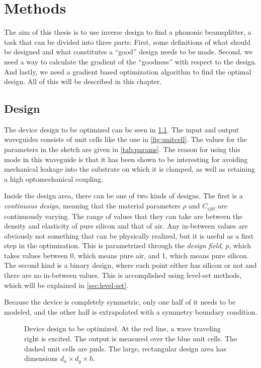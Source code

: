 \chapter{Methods}\label{sec:methods}

The aim of this thesis is to use inverse design to find a phononic beamsplitter,
a task that can be divided into three parts: 
First, some definitions of what
should be designed and what constitutes a ``good'' design needs to be made.
Second, we need a way to calculate the gradient of the ``goodness'' with respect
to the design.
And lastly, we need a gradient based optimization algorithm to find the optimal
design.
All of this will be described in this chapter.

\section{Design}

The device design to be optimized can be seen in \cref{fig:bs-design}.
The input and output waveguides consists of unit cells like the one in
\cref{fig:unitcell}.
The values for the parameters in the sketch are given in \cref{tab:params}.
The reason for using this mode in this waveguide is that it has been shown to be
interesting for avoiding mechanical leakage into the substrate on which it is
clamped, as well as retaining a high optomechanical
coupling.\cite{kolvik_clamped_2023}

Inside the design area, there can be one of two kinds of designs.
The first is a \emph{continuous design}, meaning that the material parameters
$\rho$ and $C_{ijkl}$ are continuously varying. The range of values that they
can take are between the density and elasticity of pure silicon and that of air.
Any in-between values are obviously not something that can be physically
realized, but it is useful as a first step in the optimization.
This is parametrized through the \emph{design field}, $p$, which takes values
between 0, which means pure air, and 1, which means pure silicon.
The second kind is a binary design, where each point either has silicon or not
and there are no in-between values.
This is accomplished using level-set methods, which will be explained in
\cref{sec:level-set}.

Because the device is completely symmetric, only one half of it needs to be
modeled, and the other half is extrapolated with a symmetry boundary condition.

\begin{figure}[htpb]
	\centering
	
	\caption{
		Device design to be optimized.
		At the red line, a wave traveling right is excited.
		The output is measured over the blue unit cells.
		The dashed unit cells are \glspl{pml}.
		The large, rectangular design area has dimensions $d_x \times d_y \times
		h$.
	}
	\label{fig:bs-design}
\end{figure}

